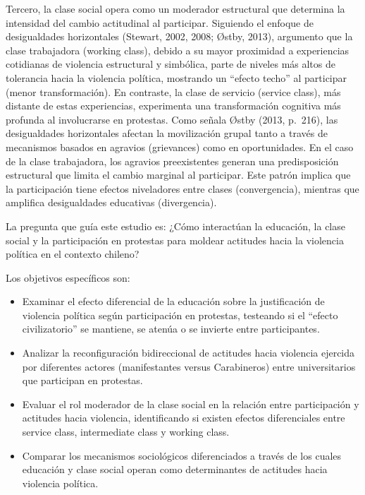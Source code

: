 \documentclass[
  12pt,
]{article}
\begin{document}
Tercero, la clase social opera como un moderador estructural que
determina la intensidad del cambio actitudinal al participar. Siguiendo
el enfoque de desigualdades horizontales (Stewart, 2002, 2008; Østby,
2013), argumento que la clase trabajadora (working class), debido a su
mayor proximidad a experiencias cotidianas de violencia estructural y
simbólica, parte de niveles más altos de tolerancia hacia la violencia
política, mostrando un ``efecto techo'' al participar (menor
transformación). En contraste, la clase de servicio (service class), más
distante de estas experiencias, experimenta una transformación cognitiva
más profunda al involucrarse en protestas. Como señala Østby (2013,
p.~216), las desigualdades horizontales afectan la movilización grupal
tanto a través de mecanismos basados en agravios (grievances) como en
oportunidades. En el caso de la clase trabajadora, los agravios
preexistentes generan una predisposición estructural que limita el
cambio marginal al participar. Este patrón implica que la participación
tiene efectos niveladores entre clases (convergencia), mientras que
amplifica desigualdades educativas (divergencia).

La pregunta que guía este estudio es: ¿Cómo interactúan la educación, la
clase social y la participación en protestas para moldear actitudes
hacia la violencia política en el contexto chileno?

Los objetivos específicos son:

\begin{itemize}
\item
  Examinar el efecto diferencial de la educación sobre la justificación
  de violencia política según participación en protestas, testeando si
  el ``efecto civilizatorio'' se mantiene, se atenúa o se invierte entre
  participantes.
\item
  Analizar la reconfiguración bidireccional de actitudes hacia violencia
  ejercida por diferentes actores (manifestantes versus Carabineros)
  entre universitarios que participan en protestas.
\item
  Evaluar el rol moderador de la clase social en la relación entre
  participación y actitudes hacia violencia, identificando si existen
  efectos diferenciales entre service class, intermediate class y
  working class.
\item
  Comparar los mecanismos sociológicos diferenciados a través de los
  cuales educación y clase social operan como determinantes de actitudes
  hacia violencia política.
\end{itemize}
\end{document}
